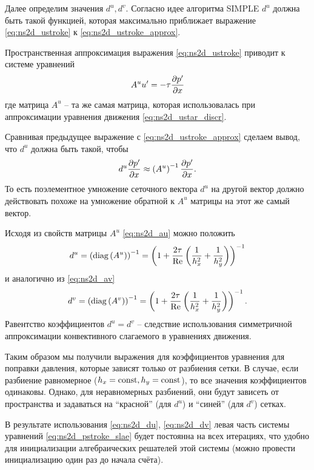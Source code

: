 Далее определим значения $d^u, d^v$.
Согласно идее алгоритма SIMPLE $d^u$ должна
быть такой функцией, которая максимально приближает
выражение \eqref{eq:ns2d_ustroke} к \eqref{eq:ns2d_ustroke_approx}.

Пространственная аппроксимация выражения \eqref{eq:ns2d_ustroke}
приводит к системе уравнений
\begin{equation*}
    A^u u' = -\tau\frac{\partial p'}{\partial x}
\end{equation*}
где матрица $A^u$ -- та же самая матрица, которая использовалась
при аппроксимации уравнения движения \eqref{eq:ns2d_ustar_discr}.

Сравнивая предыдущее выражение с \eqref{eq:ns2d_ustroke_approx}
сделаем вывод, что $d^u$ должна быть такой, чтобы
\begin{equation*}
    d^u \frac{\partial p'}{\partial x} \approx \left(A^u\right)^{-1} \frac{\partial p'}{\partial x}.
\end{equation*}
То есть поэлементное умножение сеточного вектора ${d^u}$ 
на другой вектор
должно действовать похоже на умножение обратной к $A^u$ матрицы на этот же самый вектор.

Исходя из свойств матрицы $A^u$ \eqref{eq:ns2d_au} можно
положить 
\begin{equation}
    \label{eq:ns2d_du}
    d^u = \left({\rm diag}\left(A^u\right)\right)^{-1} = 
        \left(1 + \frac{2\tau}{\mathrm{Re}}\left(\frac{1}{h_x^2} + \frac{1}{h_y^2}\right)\right)^{-1}
\end{equation}
и аналогично из \eqref{eq:ns2d_av}
\begin{equation}
    \label{eq:ns2d_dv}
    d^v = \left({\rm diag}\left(A^v\right) \right)^{-1}= 
        \left(1 + \frac{2\tau}{\mathrm{Re}}\left(\frac{1}{h_x^2} + \frac{1}{h_y^2}\right)\right)^{-1}.
\end{equation}
Равентство коэффициентов $d^u = d^v$ -- следствие использования симметричной
аппроксимации конвективного слагаемого в уравнениях движения.

Таким образом мы получили выражения для коэффициентов уравнения для поправки давления,
которые зависят только от разбиения сетки.
В случае, если разбиение равномерное ($h_x = {\rm const}, h_y = {\rm const}$),
то все значения коэффициентов одинаковы.
Однако, для неравномерных разбиений, они будут зависеть
от пространства и задаваться на ``красной'' (для $d^u$) и ``синей'' (для $d^v$)
сетках.

В результате использования \eqref{eq:ns2d_du}, \eqref{eq:ns2d_dv} левая часть системы уравнений \eqref{eq:ns2d_pstroke_slae}
будет постоянна на всех итерациях, что удобно для инициализации алгебраических решателей этой системы
(можно провести инициализацию один раз до начала счёта).

